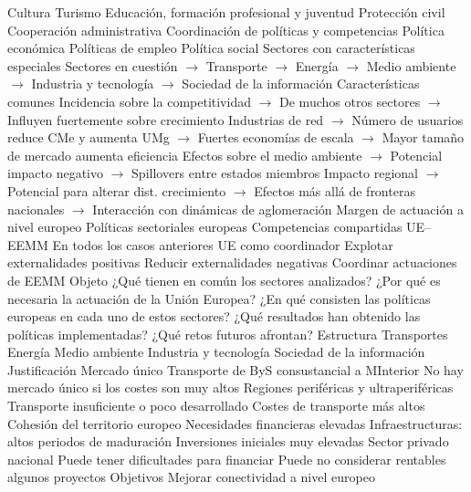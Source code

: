 \documentclass{nuevotema}
\begin{document}
\begin{esquemal}
				\4[] Cultura
				\4[] Turismo
				\4[] Educación, formación profesional y juventud
				\4[] Protección civil
				\4[] Cooperación administrativa
				\4 Coordinación de políticas y competencias
				\4[] Política económica
				\4[] Políticas de empleo
				\4[] Política social
			\3 Sectores con características especiales
				\4 Sectores en cuestión
				\4[] $\to$ Transporte
				\4[] $\to$ Energía
				\4[] $\to$ Medio ambiente
				\4[] $\to$ Industria y tecnología
				\4[] $\to$ Sociedad de la información
				\4 Características comunes
				\4[] Incidencia sobre la competitividad
				\4[] $\to$ De muchos otros sectores
				\4[] $\to$ Influyen fuertemente sobre crecimiento
				\4[] Industrias de red
				\4[] $\to$ Número de usuarios reduce CMe y aumenta UMg
				\4[] $\to$ Fuertes economías de escala
				\4[] $\to$ Mayor tamaño de mercado aumenta eficiencia
				\4[] Efectos sobre el medio ambiente
				\4[] $\to$ Potencial impacto negativo
				\4[] $\to$ Spillovers entre estados miembros
				\4[] Impacto regional
				\4[] $\to$ Potencial para alterar dist. crecimiento
				\4[] $\to$ Efectos más allá de fronteras nacionales
				\4[] $\to$ Interacción con dinámicas de aglomeración
				\4[$\then$] Margen de actuación a nivel europeo
			\3 Políticas sectoriales europeas
				\4 Competencias compartidas UE--EEMM
				\4[] En todos los casos anteriores
				\4 UE como coordinador
				\4[] Explotar externalidades positivas
				\4[] Reducir externalidades negativas
				\4[] Coordinar actuaciones de EEMM
		\2 Objeto
			\3 ¿Qué tienen en común los sectores analizados?
			\3 ¿Por qué es necesaria la actuación de la Unión Europea?
			\3 ¿En qué consisten las políticas europeas en cada uno de estos sectores?
			\3 ¿Qué resultados han obtenido las políticas implementadas?
			\3 ¿Qué retos futuros afrontan?
		\2 Estructura
			\3 Transportes
			\3 Energía
			\3 Medio ambiente
			\3 Industria y tecnología
			\3 Sociedad de la información
	\1 
		\2 Justificación
			\3 Mercado único
				\4 Transporte de ByS consustancial a MInterior
				\4 No hay mercado único si los costes son muy altos
			\3 Regiones periféricas y ultraperiféricas
				\4 Transporte insuficiente o poco desarrollado
				\4 Costes de transporte más altos
				\4 Cohesión del territorio europeo
			\3 Necesidades financieras elevadas
				\4 Infraestructuras: altos periodos de maduración
				\4 Inversiones iniciales muy elevadas
				\4 Sector privado nacional
				\4[] Puede tener dificultades para financiar
				\4[] Puede no considerar rentables algunos proyectos
		\2 Objetivos
			\3 Mejorar conectividad a nivel europeo

\end{esquemal}
\end{document}
